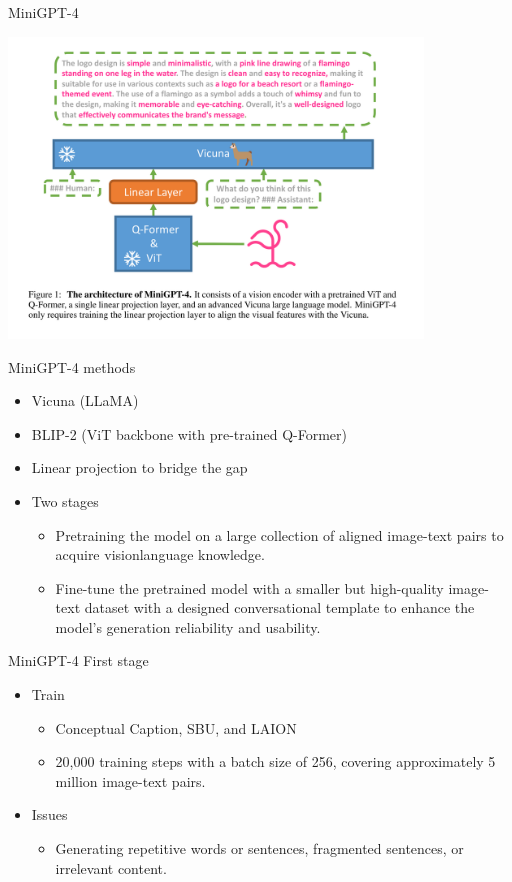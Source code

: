 \documentclass[aspectratio=1610,xcolor={dvipsnames},hyperref={colorlinks,unicode,linkcolor=violet,anchorcolor=BlueViolet,citecolor=YellowOrange,filecolor=black,urlcolor=Aquamarine}]{beamer}
\begin{document}
\begin{frame}[label={sec:org21a5123}]{MiniGPT-4}
\begin{center}
\includegraphics[height=8cm]{./p2.png}
\end{center}
\end{frame}

\begin{frame}[label={sec:org7d67193}]{MiniGPT-4 methods}
\begin{itemize}
\item Vicuna (LLaMA)
\item BLIP-2 (ViT backbone with pre-trained Q-Former)
\item Linear projection to bridge the gap
\item Two stages
\begin{itemize}
\item Pretraining the model on a large collection of aligned image-text pairs to acquire visionlanguage knowledge.
\item Fine-tune the pretrained model with a smaller but high-quality image-text dataset with a designed conversational template to enhance the model’s generation reliability and usability.
\end{itemize}
\end{itemize}
\end{frame}

\begin{frame}[label={sec:org57fc3e0}]{MiniGPT-4 First stage}
\begin{itemize}
\item Train
\begin{itemize}
\item Conceptual Caption, SBU, and LAION
\item 20,000 training steps with a batch size of 256, covering approximately 5 million image-text pairs.
\end{itemize}
\item Issues
\begin{itemize}
\item Generating repetitive words or sentences, fragmented sentences, or irrelevant content.
\end{itemize}
\end{itemize}
\end{frame}
\end{document}
